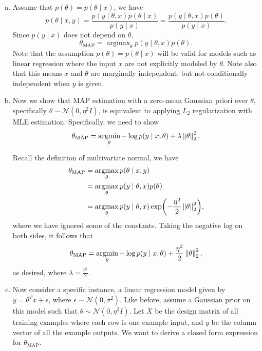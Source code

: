 \documentclass[12pt,letterpaper,boxed]{hmcpset}
\DeclareMathOperator*{\argmax}{argmax}
\DeclareMathOperator*{\argmin}{argmin}
\begin{document}
\begin{solution}
  \begin{enumerate}[(a)]
    \item Assume that $p(\theta) = p(\theta \mid x)$, we have
    \[
    p(\theta \mid x,y) = \frac{p(y \mid \theta, x)p(\theta \mid x)}{p(y \mid x)} = \frac{p(y \mid \theta, x) p(\theta)}{p(y \mid x)}.
    \]
    Since $p(y \mid x)$ does not depend on $\theta$, 
    \[
    \theta_{\mathrm{MAP}} = \argmax_\theta p(y \mid \theta, x) p(\theta).
    \]
    Note that the assumption $p(\theta) = p(\theta \mid x)$ will be valid for models such as linear regression where the input $x$ are not explicitly modeled by $\theta$. Note also that this means $x$ and $\theta$ are marginally independent, but not conditionally independent when $y$ is given.

    \item Now we show that MAP estimation with a zero-mean Gaussian priori over $\theta$, specifically $\theta \sim \mathcal{N}(0, \eta^2 I)$, is equivalent to applying $L_2$ regularization with MLE estimation. Specifically, we need to show
    \[
    \theta_{\mathrm{MAP}} = \argmin_{\theta} -\log p(y \mid x, \theta) + \lambda \norm{\theta}_2^2.
    \]

    Recall the definition of multivariate normal, we have
    \[
    \begin{aligned}  
      \theta_{\mathrm{MAP}} &= \argmax_\theta p(\theta \mid x,y) \\
      &= \argmax_\theta p(y \mid \theta,x) p(\theta) \\
      &= \argmax_\theta p(y \mid \theta,x) \exp(-\frac{\eta^2}{2} \norm{\theta}_2^2),
    \end{aligned}
    \]
    where we have ignored some of the constants. Taking the negative log on both sides, it follows that
    \[
    \theta_{\mathrm{MAP}} = \argmin_\theta -\log p(y \mid x, \theta) + \frac{\eta^2}{2} \norm{\theta}_2^2,
    \]
    as desired, where $\lambda = \frac{\eta^2}{2}$.

    \item Now consider a specific instance, a linear regression model given by $y = \theta^T x + \epsilon$, where $\epsilon \sim \mathcal{N}(0, \sigma^2)$. Like before, assume a Gaussian prior on this model such that $\theta \sim \mathcal{N}(0,\eta^2 I).$ Let $X$ be the design matrix of all training examples where each row is one example input, and $y$ be the column vector of all the example outputs. We want to derive a closed form expression for $\theta_{\mathrm{MAP}}$.
  \end{enumerate}
\end{solution}
\end{document}
